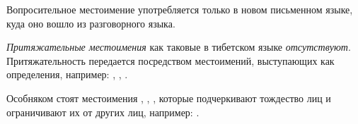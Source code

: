 Вопросительное местоимение  употребляется только в новом письменном языке, куда оно вошло из разговорного языка.

\emph{Притяжательные местоимения} как таковые в тибетском языке \emph{отсутствуют}. Притяжательность передается посредством местоимений, выступающих как определения, например:
,
,
.

Особняком стоят местоимения	, , , которые подчеркивают тождество лиц и ограничивают их от других лиц, например: .